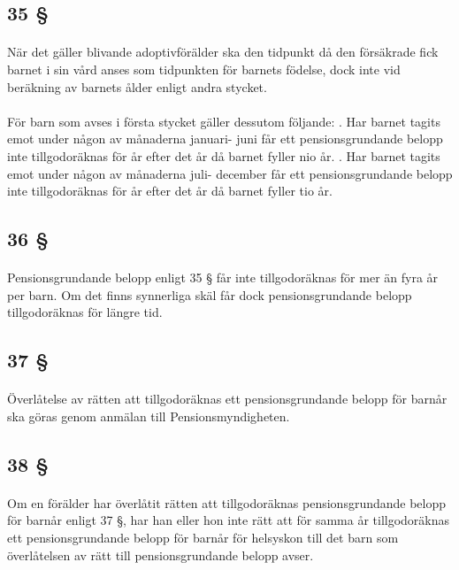 \documentclass[a4paper,notitlepage,openany,10pt]{book}
\begin{document}
\subsection*{35 §}
\paragraph*{}
När det gäller blivande adoptivförälder ska den tidpunkt då den försäkrade fick barnet i sin vård anses som tidpunkten för barnets födelse, dock inte vid beräkning av barnets ålder enligt andra stycket.
\paragraph*{}
För barn som avses i första stycket gäller dessutom följande:
. Har barnet tagits emot under någon av månaderna januari- juni får ett pensionsgrundande belopp inte tillgodoräknas för år efter det år då barnet fyller nio år.
. Har barnet tagits emot under någon av månaderna juli- december får ett pensionsgrundande belopp inte tillgodoräknas för år efter det år då barnet fyller tio år.
\subsection*{36 §}
\paragraph*{}
Pensionsgrundande belopp enligt 35 § får inte tillgodoräknas för mer än fyra år per barn. Om det finns synnerliga skäl får dock pensionsgrundande belopp tillgodoräknas för längre tid.
\subsection*{37 §}
\paragraph*{}
Överlåtelse av rätten att tillgodoräknas ett pensionsgrundande belopp för barnår ska göras genom anmälan till Pensionsmyndigheten.
\subsection*{38 §}
\paragraph*{}
Om en förälder har överlåtit rätten att tillgodoräknas pensionsgrundande belopp för barnår enligt 37 §, har han eller hon inte rätt att för samma år tillgodoräknas ett pensionsgrundande belopp för barnår för helsyskon till det barn som överlåtelsen av rätt till pensionsgrundande belopp avser.
\end{document}
